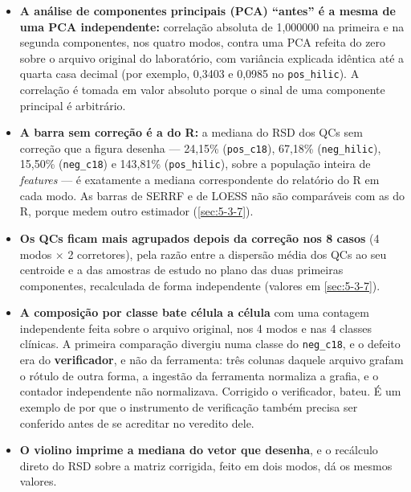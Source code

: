 \begin{itemize}
\item \textbf{A análise de componentes principais (PCA) ``antes'' é a mesma de uma PCA independente:} correlação absoluta de 1,000000 na primeira e na segunda componentes, nos quatro modos, contra uma PCA refeita do zero sobre o arquivo original do laboratório, com variância explicada idêntica até a quarta casa decimal (por exemplo, 0,3403 e 0,0985 no \texttt{pos\_\allowbreak{}hilic}). A correlação é tomada em valor absoluto porque o sinal de uma componente principal é arbitrário.
\item \textbf{A barra sem correção é a do R:} a mediana do RSD dos QCs sem correção que a figura desenha --- 24,15\% (\texttt{pos\_\allowbreak{}c18}), 67,18\% (\texttt{neg\_\allowbreak{}hilic}), 15,50\% (\texttt{neg\_\allowbreak{}c18}) e 143,81\% (\texttt{pos\_\allowbreak{}hilic}), sobre a população inteira de \textit{features} --- é exatamente a mediana correspondente do relatório do R em cada modo. As barras de SERRF e de LOESS não são comparáveis com as do R, porque medem outro estimador (\ref{sec:5-3-7}).
\item \textbf{Os QCs ficam mais agrupados depois da correção nos 8 casos} (4 modos $\times$ 2 corretores), pela razão entre a dispersão média dos QCs ao seu centroide e a das amostras de estudo no plano das duas primeiras componentes, recalculada de forma independente (valores em \ref{sec:5-3-7}).
\item \textbf{A composição por classe bate célula a célula} com uma contagem independente feita sobre o arquivo original, nos 4 modos e nas 4 classes clínicas. A primeira comparação divergiu numa classe do \texttt{neg\_\allowbreak{}c18}, e o defeito era do \textbf{verificador}, e não da ferramenta: três colunas daquele arquivo grafam o rótulo de outra forma, a ingestão da ferramenta normaliza a grafia, e o contador independente não normalizava. Corrigido o verificador, bateu. É um exemplo de por que o instrumento de verificação também precisa ser conferido antes de se acreditar no veredito dele.
\item \textbf{O violino imprime a mediana do vetor que desenha}, e o recálculo direto do RSD sobre a matriz corrigida, feito em dois modos, dá os mesmos valores.
\end{itemize}

